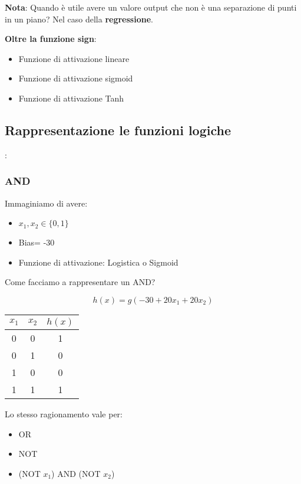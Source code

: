 \textbf{Nota}: Quando è utile avere un valore output che non è una separazione di punti in un piano? Nel caso della \textbf{regressione}.

\textbf{Oltre la funzione sign}:
\begin{itemize}
    \item Funzione di attivazione lineare
    \item Funzione di attivazione sigmoid
    \item Funzione di attivazione Tanh
\end{itemize}

\subsection{Rappresentazione le funzioni logiche}:

\subsubsection{AND}
Immaginiamo di avere:
\begin{itemize}
    \item $x_1,x_2 \in \{0,1\}$
    \item Bias= -30
    \item Funzione di attivazione: Logistica o Sigmoid
\end{itemize}

Come facciamo a rappresentare un AND?

\begin{equation}
    h(x)= g(-30+20x_1 +20x_2)
\end{equation}
\begin{center}
    \begin{tabular}{|c|c|c|}
        \hline
        $x_1$ & $x_2$ & $h(x)$ \\
        \hline
        0     & 0     & 1      \\
        0     & 1     & 0      \\
        1     & 0     & 0      \\
        1     & 1     & 1      \\
        \hline
    \end{tabular}
\end{center}

Lo stesso ragionamento vale per:
\begin{itemize}
    \item OR
    \item NOT
    \item (NOT $x_1$) AND (NOT $x_2$)
\end{itemize}

